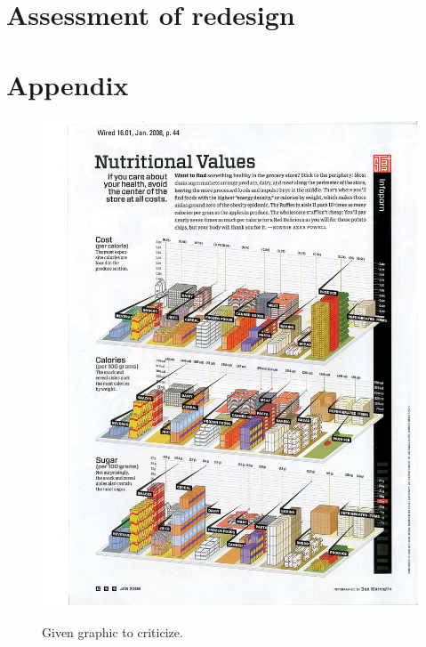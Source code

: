 \documentclass[a4paper]{scrartcl}
\begin{document}

\section{Assessment of redesign}






\newpage
\clearpage
\section{Appendix}

\begin{figure}[h]
  \centering
	\includegraphics[scale=0.20]{figures/assignmentGraphic.jpg}
  \label{assignmentGraphic}
  \caption{Given graphic to criticize.}
\end{figure}
\end{document}
